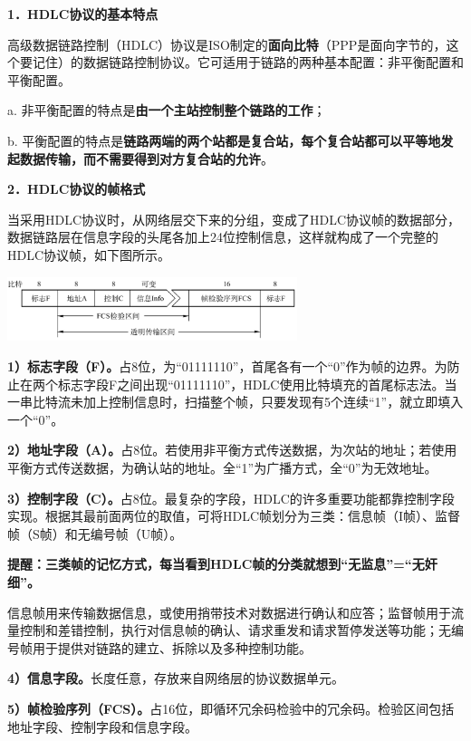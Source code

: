 \textbf{{1．HDLC协议的基本特点}}

{高级数据链路控制（HDLC）协议是ISO制定的{\textbf{面向比特}}（PPP是面向字节的，这个要记住）的数据链路控制协议。它可适用于链路的两种基本配置：非平衡配置和平衡配置。}

{a. 非平衡配置的特点是\textbf{由一个主站控制整个链路的工作}；}

{b.
平衡配置的特点是\textbf{链路两端的两个站都是复合站，每个复合站都可以平等地发起数据传输，而不需要得到对方复合站的允许}。}

\textbf{{2．HDLC协议的帧格式}}

当采用HDLC协议时，从网络层交下来的分组，变成了HDLC协议帧的数据部分，数据链路层在信息字段的头尾各加上24位控制信息，这样就构成了一个完整的HDLC协议帧，如下图所示。

\includegraphics[width=3.33333in,height=0.73958in]{png-jpeg-pics/C2E8D187B3C55AEC1CDD2367ED1EB03B.png}

\textbf{1）标志字段（F）。}占8位，为``01111110''，首尾各有一个``0''作为帧的边界。为防止在两个标志字段F之间出现``01111110''，HDLC使用比特填充的首尾标志法。当一串比特流未加上控制信息时，扫描整个帧，只要发现有5个连续``1''，就立即填入一个``0''。

\textbf{2）地址字段（A）。}占8位。若使用非平衡方式传送数据，为次站的地址；若使用平衡方式传送数据，为确认站的地址。全``1''为广播方式，全``0''为无效地址。

\textbf{3）控制字段（C）。}占8位。最复杂的字段，HDLC的许多重要功能都靠控制字段实现。根据其最前面两位的取值，可将HDLC帧划分为三类：信息帧（I帧）、监督帧（S帧）和无编号帧（U帧）。

{\textbf{提醒：三类帧的记忆方式，每当看到HDLC帧的分类就想到``无监息''=``无奸细''。}}

信息帧用来传输数据信息，或使用捎带技术对数据进行确认和应答；监督帧用于流量控制和差错控制，执行对信息帧的确认、请求重发和请求暂停发送等功能；无编号帧用于提供对链路的建立、拆除以及多种控制功能。

\textbf{4）信息字段。}长度任意，存放来自网络层的协议数据单元。

\textbf{5）帧检验序列（FCS）。}占16位，即循环冗余码检验中的冗余码。检验区间包括地址字段、控制字段和信息字段。
